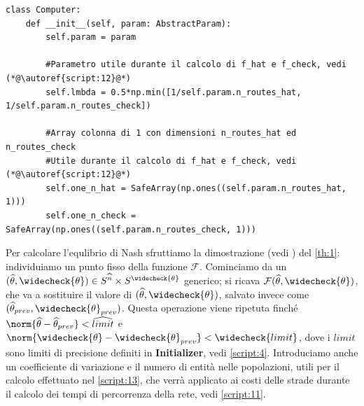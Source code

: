 \begin{lstlisting}[style=myStile, caption={Computer}, label={script:8}]
    class Computer:    
    def __init__(self, param: AbstractParam):
        self.param = param
        
        #Parametro utile durante il calcolo di f_hat e f_check, vedi (*@\autoref{script:12}@*)
        self.lmbda = 0.5*np.min([1/self.param.n_routes_hat, 1/self.param.n_routes_check])
        
        #Array colonna di 1 con dimensioni n_routes_hat ed n_routes_check 
        #Utile durante il calcolo di f_hat e f_check, vedi (*@\autoref{script:12}@*)
        self.one_n_hat = SafeArray(np.ones((self.param.n_routes_hat, 1)))
        self.one_n_check = SafeArray(np.ones((self.param.n_routes_check, 1)))
\end{lstlisting}

Per calcolare l'equlibrio di Nash sfruttiamo la dimostrazione (vedi \cite[Cap. 4]{MR4911797}) del \autoref{th:1}: individuiamo un punto fisso della funzione $\mathcal{F}$.
Cominciamo da un $(\widehat{\theta}, \widecheck{\theta})\in S^{\widehat{n}}\times S^{\widecheck{\theta}}$ generico; si ricava $\mathcal{F}(\widehat{\theta}, \widecheck{\theta})$,
che va a sostituire il valore di $(\widehat{\theta}, \widecheck{\theta})$, salvato invece come $(\widehat{\theta}_{prev}, \widecheck{\theta}_{prev})$. Questa operazione viene ripetuta finché
$\norm{\widehat{\theta} - \widehat{\theta}_{prev}} < \widehat{limit}$ e $\norm{\widecheck{\theta} - \widecheck{\theta}_{prev}} < \widecheck{limit}$, dove i $limit$ sono limiti di precisione
definiti in \textbf{Initializer}, vedi \autoref{script:4}. Introduciamo anche un coefficiente di variazione e il numero di entità nelle popolazioni, utili per il calcolo effettuato
nel \autoref{script:13}, che verrà applicato ai costi delle strade durante il calcolo dei tempi di percorrenza della rete, vedi \autoref{script:11}. 

